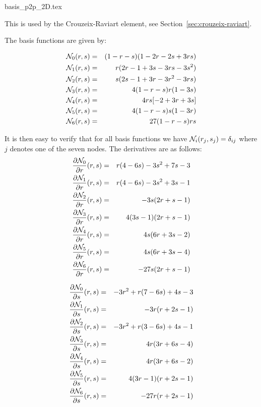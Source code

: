 \begin{flushright} {\tiny {\color{gray} basis\_p2p\_2D.tex}} \end{flushright}

This is used by the Crouzeix-Raviart element, see Section~\ref{sec:crouzeix-raviart}. 




The basis functions are given by:

\begin{mdframed}[backgroundcolor=blue!5]
\begin{eqnarray}
{\mathcal{N}}_0(r,s) &=&  (1-r-s)(1-2r-2s+ 3rs) \\
{\mathcal{N}}_1(r,s) &=& r (2 r -1 + 3s-3rs-3s^2 ) \\
{\mathcal{N}}_2(r,s) &=& s (2s -1 + 3r-3r^2-3rs )\\
{\mathcal{N}}_3(r,s) &=& 4(1-r-s)r(1 -3s ) \\
{\mathcal{N}}_4(r,s) &=& 4rs [-2+3r+3s]\\
{\mathcal{N}}_5(r,s) &=& 4(1-r-s)s(1-3r)\\
{\mathcal{N}}_6(r,s) &=& 27 (1-r-s)rs 
\end{eqnarray}
\end{mdframed}
It is then easy to verify that for all basis functions we have 
${\mathcal{N}}_i(r_j,s_j)=\delta_{ij}$ where $j$ denotes one of the seven nodes. 
The derivatives are as follows:
\begin{eqnarray}
\frac{\partial {\mathcal{N}}_0}{\partial r}(r,s) &=& r(4-6s)-3s^2+7s-3\\
\frac{\partial {\mathcal{N}}_1}{\partial r}(r,s) &=& r(4-6s)-3s^2+3s-1\\
\frac{\partial {\mathcal{N}}_2}{\partial r}(r,s) &=& -3s(2r+s-1)  \\
\frac{\partial {\mathcal{N}}_3}{\partial r}(r,s) &=& 4(3s-1)(2r+s-1) \\
\frac{\partial {\mathcal{N}}_4}{\partial r}(r,s) &=& 4s(6r+3s-2) \\
\frac{\partial {\mathcal{N}}_5}{\partial r}(r,s) &=& 4s(6r+3s-4)\\
\frac{\partial {\mathcal{N}}_6}{\partial r}(r,s) &=& -27s(2r+s-1)
\end{eqnarray}

\begin{eqnarray}
\frac{\partial {\mathcal{N}}_0}{\partial s}(r,s) &=& -3r^2+r(7-6s)+4s-3\\
\frac{\partial {\mathcal{N}}_1}{\partial s}(r,s) &=& -3r(r+2s-1)\\
\frac{\partial {\mathcal{N}}_2}{\partial s}(r,s) &=& -3r^2+r(3-6s)+4s-1 \\
\frac{\partial {\mathcal{N}}_3}{\partial s}(r,s) &=& 4r(3r+6s-4)  \\
\frac{\partial {\mathcal{N}}_4}{\partial s}(r,s) &=& 4r(3r+6s-2) \\
\frac{\partial {\mathcal{N}}_5}{\partial s}(r,s) &=& 4(3r-1)(r+2s-1)\\
\frac{\partial {\mathcal{N}}_6}{\partial s}(r,s) &=& -27r(r+2s-1)
\end{eqnarray}

